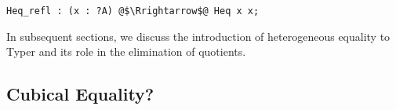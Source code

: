 \documentclass[12pt,twoside,maitrise]{dms}
\theoremstyle{definition}
\numberwithin{equation}{section}
\numberwithin{table}{chapter}
\numberwithin{figure}{chapter}
\newcommand\kw[1] {\textsf{#1}}
\begin{document}
\begin{verbatim}
Heq_refl : (x : ?A) @$\Rrightarrow$@ Heq x x;
\end{verbatim}

In subsequent sections, we discuss the introduction of heterogeneous equality to
Typer and its role in the elimination of quotients.






\subsection*{Cubical Equality?}
\end{document}
